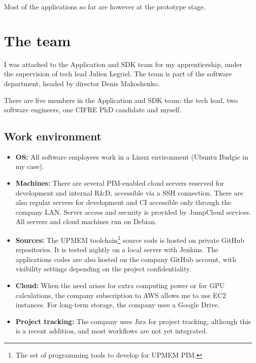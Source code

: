 Most of the applications so far are however at the prototype stage.

\section{The team}
I was attached to the Application and SDK team for my apprenticeship, under the supervision of tech lead Julien Legriel. The team is part of the software department, headed by director Denis Makoshenko.

There are five members in the Application and SDK team: the tech lead, two software engineers, one CIFRE PhD candidate and myself.

\subsection{Work environment}
\begin{itemize}
    \item \textbf{OS:} All software employees work in a Linux environment (Ubuntu Budgie in my case).
    \item \textbf{Machines:} There are several PIM-enabled cloud servers reserved for development and internal R\&D, accessible via a SSH connection. There are also regular servers for development and CI accessible only through the company LAN. Server access and security is provided by JumpCloud services. All servers and cloud machines run on Debian.
    \item \textbf{Sources:} The UPMEM toolchain\footnote{The set of programming tools to develop for UPMEM PIM.} source code is hosted on private GitHub repositories. It is tested nightly on a local server with Jenkins. The applications codes are also hosted on the company GitHub account, with visibility settings depending on the project confidentiality.
    \item \textbf{Cloud:} When the need arises for extra computing power or for GPU calculations, the company subscription to AWS allows me to use EC2 instances. For long-term storage, the company uses a Google Drive.
    \item \textbf{Project tracking:} The company uses Jira for project tracking, although this is a recent addition, and most workflows are not yet integrated.
\end{itemize}



